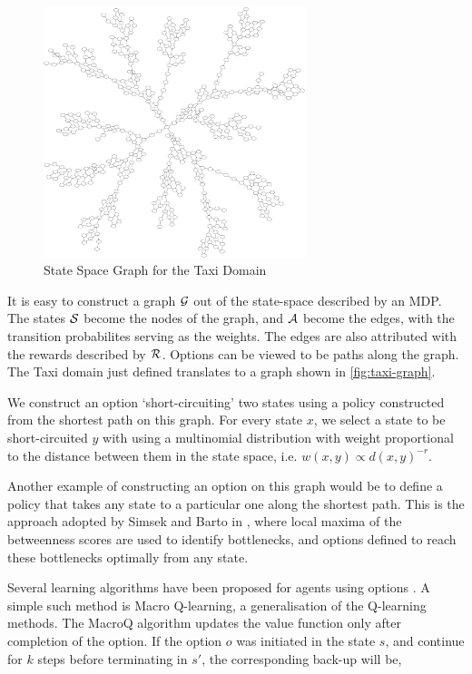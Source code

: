 \begin{figure}[h]
    \center
    \includegraphics[width=3in]{figures/taxi1}
    \caption{State Space Graph for the Taxi Domain}
    \label{fig:taxi-graph}
\end{figure}

It is easy to construct a graph $\mathcal{G}$ out of the state-space described by an
MDP. The states $\mathcal{S}$ become the nodes of the graph, and $\mathcal{A}$ become
the edges, with the transition probabilites serving as the weights. The edges
are also attributed with the rewards described by $\mathcal{R}$. Options can be
viewed to be paths along the graph. The Taxi domain just defined translates to
a graph shown in \autoref{fig:taxi-graph}.

We construct an option `short-circuiting' two states using a policy constructed
from the shortest path on this graph. For every state $x$, we select a state to
be short-circuited $y$ with using a multinomial distribution with weight
proportional to the distance between them in the state space, i.e. $w(x,y)
    \propto d(x,y)^{-r}$. 

Another example of constructing an option on this graph would be to define a
policy that takes any state to a particular one along the shortest path. This is
the approach adopted by Simsek and Barto in \cite{Simsek}, where local maxima of
the betweenness scores are used to identify bottlenecks, and options defined to
reach these bottlenecks optimally from any state.

Several learning algorithms have been proposed for agents using options
\cite{SuttonPrecupSingh1998,BartoMahadevan}. A simple such method is Macro
Q-learning, a generalisation of the Q-learning methods. The MacroQ algorithm
updates the value function only after completion of the option. If the option
$o$ was initiated in the state $s$, and continue for $k$ steps before
terminating in $s'$, the corresponding back-up will be,

